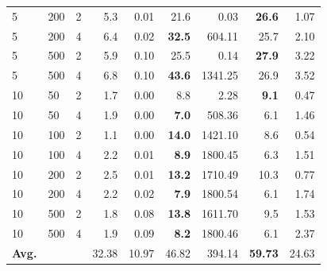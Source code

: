 \documentclass[runningheads]{llncs}
\begin{document}
\begin{table}[!ht]
{\begin{tabular}{lll|rr|rr|rr}
			5 &      200 &         2 &             5.3 &         0.01 &                     21.6 &                  0.03 &         \textbf{26.6} &      1.07 \\
			5 &      200 &         4 &             6.4 &         0.02 &                     \textbf{32.5} &                604.11 &         {25.7} &      2.10 \\
			5 &      500 &         2 &             5.9 &         0.10 &                     25.5 &                  0.14 &         \textbf{27.9} &      3.22 \\
			5 &      500 &         4 &             6.8 &         0.10 &                     \textbf{43.6} &               1341.25 &         26.9 &      3.52 \\ \hline
			10 &       50 &         2 &             1.7 &         0.00 &                      8.8 &                  2.28 &          \textbf{9.1} &      0.47 \\ 
			10 &       50 &         4 &             1.9 &         0.00 &                      \textbf{7.0} &                508.36 &          6.1 &      1.46 \\
			10 &      100 &         2 &             1.1 &         0.00 &                     \textbf{14.0} &               1421.10 &          8.6 &      0.54 \\
			10 &      100 &         4 &             2.2 &         0.01 &                      \textbf{8.9} &               1800.45 &          {6.3} &      1.51 \\
			10 &      200 &         2 &             2.5 &         0.01 &                     \textbf{13.2} &               1710.49 &         10.3 &      0.77 \\
			10 &      200 &         4 &             2.2 &         0.02 &                      \textbf{7.9} &               1800.54 &          6.1 &      1.74 \\
			10 &      500 &         2 &             1.8 &         0.08 &                     \textbf{13.8} &               1611.70 &          {9.5} &      1.53 \\
			10 &      500 &         4 &             1.9 &         0.09 &                      \textbf{8.2} &               1800.46 &          6.1 &      2.37 \\
			\hline \hline
			\textbf{Avg.} &  &  &  32.38 & 10.97 & 46.82 & 394.14 &  \textbf{59.73} & 24.63  \\ \hline \hline
	\end{tabular}}
\end{table}
\end{document}
